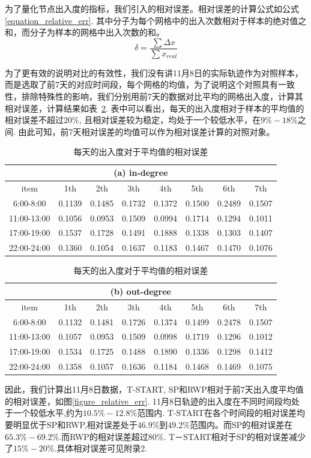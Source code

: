 为了量化节点出入度的指标，我们引入的相对误差。相对误差的计算公式如公式\ref{equation_relative_err}. 其中分子为每个网格中的出入次数相对于样本的绝对值之和，而分子为样本的网格中出入次数的和。
\begin{equation}
\label{equation_relative_err}
    \delta = \frac{\sum \Delta x}{\sum x_{real}} 
\end{equation}

为了更有效的说明对比的有效性，我们没有讲11月8日的实际轨迹作为对照样本，而是选取了前7天的对应时间段，每个网格的均值，为了说明这个对照具有一致性，排除特殊性的影响，我们分别用前7天的数据对比平均的网格出入度，计算其相对误差，计算结果如表~\ref{table_relative_err_avg}. 表中可以看出，每天的出入度相对于样本的平均值的相对误差不超过$20\%$, 且相对误差较为稳定，均处于一个较低水平，在$9\%-18\%$之间.
由此可知，前7天相对误差的均值可以作为相对误差计算的对照对象。
\begin{table}[!t]
\centering
\caption{每天的出入度对于平均值的相对误差}\label{table_relative_err_avg}
\begin{tabular}[c]{c|c|c|c|c|c|c|c}
\multicolumn{8}{c}{(a) in-degree}\\
\hline
item& 1th&2th&3th&4th&5th&6th&7th\\
\hline
6:00-8:00&
0.1139& 
0.1485&
0.1732&
0.1372&
0.1500&
0.2489&
0.1507\\
11:00-13:00&
0.1056&
0.0953&
0.1509&
0.0994&
0.1714&
0.1294&
0.1011\\
17:00-19:00&
0.1537&
0.1728&
0.1491&
0.1888&
0.1338&
0.1303&
0.1407\\
22:00-24:00&
0.1360&
0.1054&
0.1637&
0.1183&
0.1467&
0.1470&
0.1076\\
\hline
\end{tabular}
\begin{tabular}[c]{c|c|c|c|c|c|c|c}
\multicolumn{8}{c}{(b) out-degree}\\
\hline
item& 1th&2th&3th&4th&5th&6th&7th\\
\hline
6:00-8:00&
0.1132&
0.1481&
0.1726&
0.1374&
0.1499&
0.2478&
0.1507\\
11:00-13:00&
0.1057&
0.0953&
0.1509&
0.0998&
0.1719&
0.1296&
0.1012\\
17:00-19:00&
0.1534&
0.1725&
0.1488&
0.1890&
0.1336&
0.1298&
0.1412\\
22:00-24:00&
0.1358&
0.1057&
0.1636&
0.1184&
0.1468&
0.1469&
0.1075\\
\hline
\end{tabular}
\end{table}

因此，我们计算出11月8日数据，T-START, SP和RWP相对于前7天出入度平均值的相对误差，如图\ref{figure_relative_err}. 11月8日轨迹的出入度在不同时间段均处于一个较低水平,约为$10.5\%-12.8\%$范围内. T-START在各个时间段的相对误差均要明显优于SP和RWP,相对误差处于$46.9\%到49.2\%$范围内。而SP的相对误差在$65.3\%-69.2\%$.而RWP的相对误差超过$80\%$. T－START相对于SP的相对误差减少了$15\%-20\%$.具体相对误差可见附录2.

